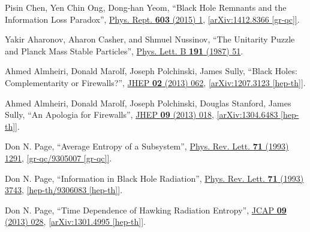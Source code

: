 \documentclass[preprintnumbers, floatfix, preprintnumbers, letterpaper, twocolumn, superscriptaddress,nofootinbib]{revtex4-2}
\begin{document}
\begin{thebibliography}{99}

Pisin Chen, Yen Chin Ong, Dong-han Yeom, ``Black Hole Remnants and the Information Loss Paradox'', {\hypersetup{urlcolor=vividviolet}\href{https://www.sciencedirect.com/science/article/abs/pii/S0370157315004391?via\%3Dihub}{Phys. Rept. \textbf{603} (2015) 1}}, \href{https://arxiv.org/abs/1412.8366}{[arXiv:1412.8366 [gr-qc]]}.

 Yakir Aharonov, Aharon Casher, and Shmuel Nussinov, ``The Unitarity Puzzle and Planck Mass Stable Particles'', {\hypersetup{urlcolor=vividviolet}\href{https://www.sciencedirect.com/science/article/abs/pii/0370269387913207?via\%3Dihub}{Phys. Lett. B \textbf{191} (1987) 51}}.

 Ahmed Almheiri, Donald Marolf, Joseph Polchinski, James Sully, ``Black Holes: Complementarity or Firewalls?'', {\hypersetup{urlcolor=vividviolet}\href{https://doi.org/10.1007/JHEP02(2013)062}{JHEP \textbf{02} (2013) 062}}, \href{https://arxiv.org/abs/1207.3123}{[arXiv:1207.3123 [hep-th]]}.

Ahmed Almheiri, Donald Marolf, Joseph Polchinski, Douglas Stanford, James Sully, ``An Apologia for Firewalls'',  {\hypersetup{urlcolor=vividviolet}\href{https://link.springer.com/article/10.1007/JHEP09(2013)018}{JHEP \textbf{09} (2013) 018}}, \href{https://arxiv.org/abs/1304.6483}{[arXiv:1304.6483 [hep-th]]}.

Don N. Page, ``Average Entropy of a Subsystem'', {\hypersetup{urlcolor=vividviolet}\href{https://doi.org/10.1103/PhysRevLett.71.1291}{Phys. Rev. Lett. \textbf{71} (1993) 1291}}, \href{https://arxiv.org/abs/gr-qc/9305007}{[gr-qc/9305007 [gr-qc]]}.

Don N. Page, ``Information in Black Hole Radiation'',  {\hypersetup{urlcolor=vividviolet}\href{https://doi.org/10.1103/PhysRevLett.71.3743}{Phys. Rev. Lett. \textbf{71} (1993) 3743}}, \href{https://arxiv.org/abs/hep-th/9306083}{[hep-th/9306083 [hep-th]]}.

Don N. Page, ``Time Dependence of Hawking Radiation Entropy'', {\hypersetup{urlcolor=vividviolet}\href{https://iopscience.iop.org/article/10.1088/1475-7516/2013/09/028}{JCAP \textbf{09} (2013) 028}}, \href{https://arxiv.org/abs/1301.4995}{[arXiv:1301.4995 [hep-th]]}.


\end{thebibliography}
\end{document}
